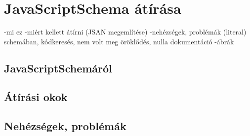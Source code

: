 \chapter*{JavaScriptSchema átírása}
-mi ez 
-miért kellett átírni (JSAN megemlítése) 
-nehézségek, problémák (literal) schemában, kódkeresés, nem volt meg öröklődés, nulla dokumentáció
-ábrák
\section{JavaScriptSchemáról}

\section{Átírási okok}

\section{Nehézségek, problémák}